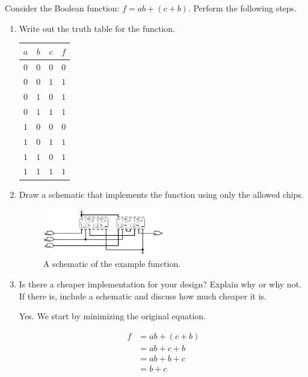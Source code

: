 \documentclass{article}
\begin{document}
Consider the Boolean function: $f = ab + (c + b)$.
Perform the following steps.

\begin{enumerate}

\item Write out the truth table for the function.

\begin{center}
\begin{tabular}{ccc|c}
$a$&$b$&$c$&$f$\\
\hline
$0$&$0$&$0$&$0$\\
$0$&$0$&$1$&$1$\\
$0$&$1$&$0$&$1$\\
$0$&$1$&$1$&$1$\\
$1$&$0$&$0$&$0$\\
$1$&$0$&$1$&$1$\\
$1$&$1$&$0$&$1$\\
$1$&$1$&$1$&$1$\\
\end{tabular}
\end{center}

\item Draw a schematic that implements the function using only the allowed chips.

\begin{figure}[h!]
    \centering
    \includegraphics[width=0.5\textwidth]{example.png}
    \caption{A schematic of the example function.}
    \label{f:example}
\end{figure}

\item Is there a cheaper implementation for your design?
    Explain why or why not.
    If there is, include a schematic and discuss how much cheaper it is.

Yes.
We start by minimizing the original equation.

\begin{align*}
    f   &= ab + (c + b)\\
        &= ab + c + b\\
        &= ab + b + c\\
        &= b + c \tag{Covering}\\
\end{align*}


\end{enumerate}
\end{document}
